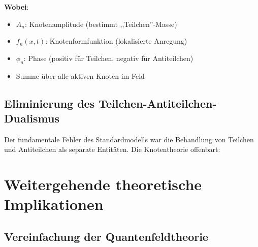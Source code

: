 	\textbf{Wobei}:
	\begin{itemize}
		\item $A_n$: Knotenamplitude (bestimmt ,,Teilchen''-Masse)
		\item $f_n(x,t)$: Knotenformfunktion (lokalisierte Anregung)
		\item $\phi_n$: Phase (positiv für Teilchen, negativ für Antiteilchen)
		\item Summe über alle aktiven Knoten im Feld
	\end{itemize}
	
	\subsection{Eliminierung des Teilchen-Antiteilchen-Dualismus}
	
	Der fundamentale Fehler des Standardmodells war die Behandlung von Teilchen und Antiteilchen als separate Entitäten. Die Knotentheorie offenbart:
	
	\begin{table}[htbp]
		\centering
		\caption{Eliminierung des Teilchen-Antiteilchen-Dualismus durch die Knotentheorie}
		\label{tab:node_theory_comparison}
	\end{table}
	
	\section{Weitergehende theoretische Implikationen}
	
	\subsection{Vereinfachung der Quantenfeldtheorie}
	
